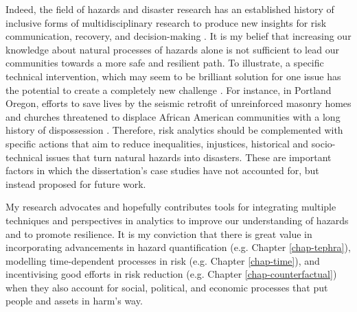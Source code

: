 Indeed, the field of hazards and disaster research has an established history of inclusive forms of multidisciplinary research \citep{kendra2014engineering} to produce new insights for risk communication, recovery, and decision-making \citep{mileti1999disasters, olson2020disaster,birkland2006lessons}. It is my belief that increasing our knowledge about natural processes of hazards alone is not sufficient to lead our communities towards a more safe and resilient path. To illustrate, a specific technical intervention, which may seem to be brilliant solution for one issue has the potential to create a completely new challenge \citep{peek2020framework}. For instance, in Portland Oregon, efforts to save lives by the seismic retrofit of unreinforced masonry homes and churches threatened to displace African American communities with a long history of dispossession \citep{njus_2019}. Therefore, risk analytics should be complemented with specific actions that aim to reduce inequalities, injustices, historical and socio-technical issues that turn natural hazards into disasters. These are important factors in which the dissertation's case studies have not accounted for, but instead proposed for future work. 

My research advocates and hopefully contributes tools for integrating multiple techniques and perspectives in analytics to improve our understanding of hazards and to promote resilience. It is my conviction that there is great value in incorporating advancements in hazard quantification (e.g. Chapter \ref{chap-tephra}), modelling time-dependent processes in risk (e.g. Chapter \ref{chap-time}), and incentivising good efforts in risk reduction (e.g. Chapter \ref{chap-counterfactual}) when they also account for social, political, and economic processes that put people and assets in harm’s way.




